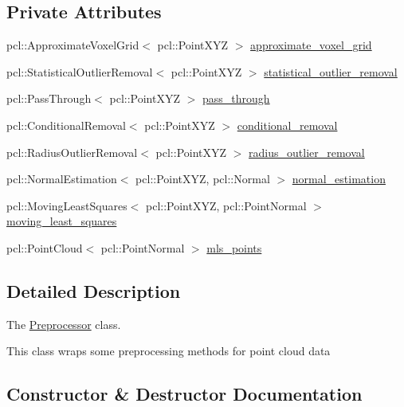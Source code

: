 \subsection*{Private Attributes}
\begin{DoxyCompactItemize}
\item 
pcl\+::\+Approximate\+Voxel\+Grid$<$ pcl\+::\+Point\+X\+YZ $>$ \hyperlink{classhull__abstraction_1_1_preprocessor_af75daaefbd886add3f9bc1c8560e5a4e}{approximate\+\_\+voxel\+\_\+grid}
\item 
pcl\+::\+Statistical\+Outlier\+Removal$<$ pcl\+::\+Point\+X\+YZ $>$ \hyperlink{classhull__abstraction_1_1_preprocessor_af9b4760942460988811e9989da18633f}{statistical\+\_\+outlier\+\_\+removal}
\item 
pcl\+::\+Pass\+Through$<$ pcl\+::\+Point\+X\+YZ $>$ \hyperlink{classhull__abstraction_1_1_preprocessor_a9396fe58d584ed1e7468f694f2458734}{pass\+\_\+through}
\item 
pcl\+::\+Conditional\+Removal$<$ pcl\+::\+Point\+X\+YZ $>$ \hyperlink{classhull__abstraction_1_1_preprocessor_a15ce757be74b4d80302c832b4b97f459}{conditional\+\_\+removal}
\item 
pcl\+::\+Radius\+Outlier\+Removal$<$ pcl\+::\+Point\+X\+YZ $>$ \hyperlink{classhull__abstraction_1_1_preprocessor_af0a5e8dd7c130abe702230dd59529360}{radius\+\_\+outlier\+\_\+removal}
\item 
pcl\+::\+Normal\+Estimation$<$ pcl\+::\+Point\+X\+YZ, pcl\+::\+Normal $>$ \hyperlink{classhull__abstraction_1_1_preprocessor_a144ae161c0d90bcc829f83c49172de82}{normal\+\_\+estimation}
\item 
pcl\+::\+Moving\+Least\+Squares$<$ pcl\+::\+Point\+X\+YZ, pcl\+::\+Point\+Normal $>$ \hyperlink{classhull__abstraction_1_1_preprocessor_abc825ebe97845aece984cae1b37208b3}{moving\+\_\+least\+\_\+squares}
\item 
pcl\+::\+Point\+Cloud$<$ pcl\+::\+Point\+Normal $>$ \hyperlink{classhull__abstraction_1_1_preprocessor_af91d53e1e4dadaa51f3518b100598b93}{mls\+\_\+points}
\end{DoxyCompactItemize}


\subsection{Detailed Description}
The \hyperlink{classhull__abstraction_1_1_preprocessor}{Preprocessor} class. 

This class wraps some preprocessing methods for point cloud data 

\subsection{Constructor \& Destructor Documentation}
